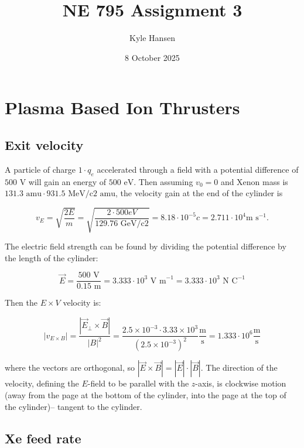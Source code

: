 \documentclass{template}
\title{NE 795 Assignment 3}
\author{Kyle Hansen}
\date{8 October 2025}
\begin{document}
\maketitle


\section{Plasma Based Ion Thrusters}

\subsection{Exit velocity}

A particle of charge $1\cdot q_e$ accelerated through a field with a potential difference of $500 \text{ V}$ will gain an energy of $500 \text{ eV}$. Then assuming $v_0 = 0$ and Xenon mass is $131.3\text{ amu}\cdot 931.5 \text{ MeV/c2 amu}$, the velocity gain at the end of the cylinder is

\begin{equation}
    \boxed{v_E = \sqrt{\frac{2E}{m}} = \sqrt{\frac{2\cdot 500 eV}{129.76 \text{ GeV/c2}}} = 8.18 \cdot 10^{-5}c = 2.711 \cdot 10^4 \text{m s}^{-1}.}
\end{equation}

The electric field strength can be found by dividing the potential difference by the length of the cylinder:

\begin{equation}
    \vec{E} = \frac{500\text{ V}}{0.15\text{ m}} = 3.333\cdot 10^3 \text{ V m}^{-1} = 3.333\cdot 10^3 \text{ N C}^{-1}
\end{equation}

Then the $E \times V$ velocity is:

\begin{equation}
    \boxed{|v_{E\times B}| = \frac{|\vec{E}_\perp\times\vec{B}|}{|B|^2} = \frac{2.5\times10^{-3}\cdot 3.33\times10^{3} }{\left(2.5\times10^{-3} \right)^2}\frac{\text{m}}{\text{s}} = 1.333\cdot 10^6 \frac{\text{m}}{\text{s}}
    }
\end{equation}

where the vectors are orthogonal, so $|\vec{E}\times\vec{B}| = |\vec{E}|\cdot|\vec{B}|$. The direction of the velocity, defining the $E$-field to be parallel with the $z$-axis, is clockwise motion (away from the page at the bottom of the cylinder, into the page at the top of the cylinder)-- tangent to the cylinder.

\subsection{Xe feed rate}
\end{document}
